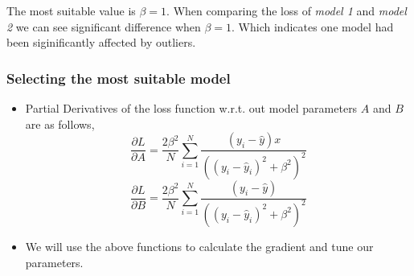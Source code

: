 \documentclass[11pt]{article}
\begin{document}
    The most suitable value is \(\beta=1\). When comparing the loss of
\emph{model 1} and \emph{model 2} we can see significant difference when
\(\beta=1\). Which indicates one model had been siginificantly affected
by outliers.

    \subsubsection{Selecting the most suitable
model}\label{selecting-the-most-suitable-model}

\begin{itemize}
\item
  Partial Derivatives of the loss function w.r.t. out model parameters
  \(A\) and \(B\) are as follows,
  \[  \frac{\partial L}{\partial A} = \frac{2\beta^2}{N} \sum \limits_{i=1}^{N} \frac{(y_i - \hat{y}) x}{((y_i - \hat{y}_i)^2 + \beta^2)^2} \]
  \[  \frac{\partial L}{\partial B} = \frac{2\beta^2}{N}  \sum \limits_{i=1}^{N} \frac{(y_i - \hat{y}) }{((y_i - \hat{y}_i)^2 + \beta^2)^2} \]
\item
  We will use the above functions to calculate the gradient and tune our
  parameters.
\end{itemize}
\end{document}
